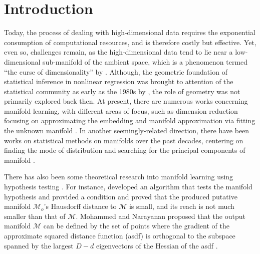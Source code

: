 \documentclass[aos,preprint]{imsart}
\theoremstyle{remark}
\begin{document}

\section{Introduction}

Today, the process of dealing with high-dimensional data requires the exponential consumption of computational resources, and is therefore costly but effective. Yet, even so, challenges remain, as the high-dimensional data tend to lie near a low-dimensional sub-manifold of the ambient space, which is a phenomenon termed ``the curse of dimensionality'' by \cite{fefferman2018fitting}.  Although, the geometric foundation of statistical inference in nonlinear regression was brought to attention of the statistical community as early as the 1980s by \cite{Kass1989}, the role of geometry was not primarily explored back then. At present, there are numerous works concerning manifold learning, with different areas of focus, such as dimension reduction focusing on approximating the embedding \citep{roweis2000nonlinear,zhang2004principal,donoho2003hessian,zha2007} and manifold approximation via fitting the unknown manifold \citep{genovese2012manifold,chen2015asymptotic,genovese2014nonparametric}. In another seemingly-related direction, there have been works on statistical methods on manifolds over the past decades, centering on finding the mode of distribution \citep{huckemann2010intrinsic,chen2016nonparametric,chen2016comprehensive} and searching for the principal components of manifold \citep{hauberg2015principal,huckemann2006principal,hastie1989principal}.

There has also been some theoretical research into manifold learning using hypothesis testing \citep{fefferman2016testing,fefferman2018fitting,fefferman2019reconstruction}. For instance, \cite{fefferman2016testing} developed an algorithm that tests the manifold hypothesis and
\cite{fefferman2018fitting} provided a condition and proved that the produced putative manifold ${\mathcal M}_o$'s Hausdorff distance to $\mathcal M$ is small, and its reach is not much smaller than that of $\mathcal M$. Mohammed and Narayanan proposed that the output manifold $\mathcal M$ can be defined by the set of points where the gradient of the approximate squared distance function (asdf) is orthogonal to the subspace spanned by the largest $D-d$ eigenvectors of the Hessian of the asdf \citep{mohammed2017manifold}.
\end{document}
